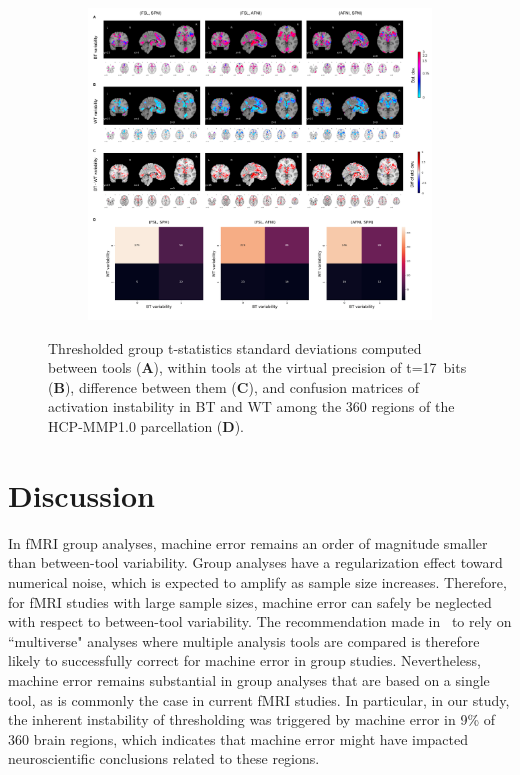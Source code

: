 \documentclass[11pt,onecolumn]{article}
\begin{document}
  \begin{figure}[ht]
        \begin{subfigure}[ht]{\textwidth}
          \centering
          \includegraphics[width=\textwidth]{figures/std/gl-thresh.png}
          \end{subfigure}
        \centering
      \caption{Thresholded group t-statistics standard deviations computed between tools (\textbf{A}),
      within tools at the virtual precision of t=17~bits (\textbf{B}), difference between them (\textbf{C}), and 
      confusion matrices of activation instability
      in BT and WT among the 360 regions of the HCP-MMP1.0 parcellation (\textbf{D}).}
      \label{fig:thresh-maps}
    \end{figure}
  

\section{Discussion}

In fMRI group analyses, machine error remains an order of magnitude smaller
than between-tool variability. Group analyses have a regularization effect
toward numerical noise, which is expected to amplify as sample size
increases. Therefore, for fMRI studies with large sample sizes, machine
error can safely be neglected with respect to between-tool variability. The
recommendation made in~\cite{botvinik2020variability} to rely on
``multiverse" analyses where multiple analysis tools are compared is
therefore likely to successfully correct for machine error in group
studies. Nevertheless, machine error remains substantial in group analyses
that are based on a single tool, as is commonly the case in current fMRI
studies. In particular, in our study, the inherent instability of
thresholding was triggered by machine error in 9\% of 360 brain regions,
which indicates that machine error might have impacted neuroscientific
conclusions related to these regions. 
\end{document}
